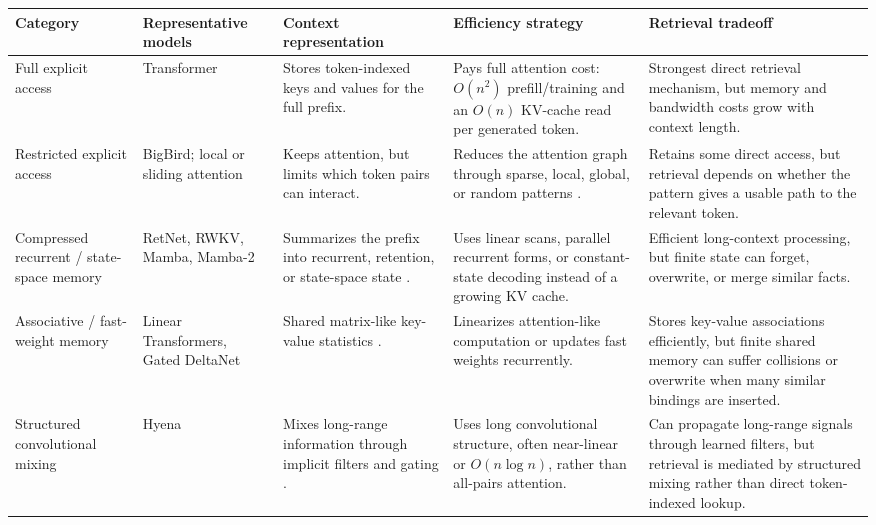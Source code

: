 \documentclass[10pt]{article}
\begin{document}
\begin{table}[H]
\centering
\scriptsize
\setlength{\tabcolsep}{1.7pt}
\renewcommand{\arraystretch}{1.04}
\begin{tabularx}{\textwidth}{
>{\raggedright\arraybackslash}p{2.35cm}
>{\raggedright\arraybackslash}p{2.65cm}
>{\raggedright\arraybackslash}X
>{\raggedright\arraybackslash}p{3.0cm}
>{\raggedright\arraybackslash}X}
\toprule
\textbf{Category} &
\textbf{Representative models} &
\textbf{Context representation} &
\textbf{Efficiency strategy} &
\textbf{Retrieval tradeoff} \\
\midrule
Full explicit access &
Transformer &
Stores token-indexed keys and values for the full prefix. &
Pays full attention cost: \(O(n^2)\) prefill/training and an \(O(n)\) KV-cache
read per generated token. &
Strongest direct retrieval mechanism, but memory and bandwidth costs grow with
context length. \\
\midrule
Restricted explicit access &
BigBird; local or sliding attention &
Keeps attention, but limits which token pairs can interact. &
Reduces the attention graph through sparse, local, global, or random patterns
\cite{zaheer2020bigbird}. &
Retains some direct access, but retrieval depends on whether the pattern gives
a usable path to the relevant token. \\
\midrule
Compressed recurrent / state-space memory &
RetNet, RWKV, Mamba, Mamba-2 &
Summarizes the prefix into recurrent, retention, or state-space state
\cite{sun2023retnet,peng2023rwkv,gu2023mamba,dao2024mamba2}. &
Uses linear scans, parallel recurrent forms, or constant-state decoding instead
of a growing KV cache. &
Efficient long-context processing, but finite state can forget, overwrite, or
merge similar facts. \\
\midrule
Associative / fast-weight memory &
Linear Transformers, Gated DeltaNet &
Shared matrix-like key-value statistics
\cite{yang2024gateddelta,schlag2021fastweight}. &
Linearizes attention-like computation or updates fast weights recurrently. &
Stores key-value associations efficiently, but finite shared memory can suffer
collisions or overwrite when many similar bindings are inserted. \\
\midrule
Structured convolutional mixing &
Hyena &
Mixes long-range information through implicit filters and gating
\cite{poli2023hyena}. &
Uses long convolutional structure, often near-linear or \(O(n\log n)\), rather
than all-pairs attention. &
Can propagate long-range signals through learned filters, but retrieval is
mediated by structured mixing rather than direct token-indexed lookup. \\

\end{tabularx}
\end{table}
\end{document}
